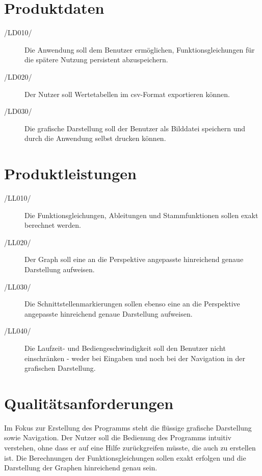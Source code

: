\documentclass[a4paper]{article}
\begin{document}
  \section{Produktdaten}
  
	  \begin{description}
	  	\item[/LD010/] Die Anwendung soll dem Benutzer ermöglichen, Funktionsgleichungen für die spätere Nutzung persistent abzuspeichern.
	  	\item[/LD020/] Der Nutzer soll Wertetabellen im csv-Format exportieren können.
	  	\item[/LD030/] Die grafische Darstellung soll der Benutzer als Bilddatei speichern und durch die Anwendung selbst drucken können.
	  \end{description}

  \section{Produktleistungen}
  
	  \begin{description}
	  	\item[/LL010/] Die Funktionsgleichungen, Ableitungen und Stammfunktionen sollen exakt berechnet werden.
	  	\item[/LL020/] Der Graph soll eine an die Perspektive angepasste hinreichend genaue Darstellung aufweisen.
	  	\item[/LL030/] Die Schnittstellenmarkierungen sollen ebenso eine an die Perspektive angepasste hinreichend genaue Darstellung aufweisen.
	  	\item[/LL040/] Die Laufzeit- und Bediengeschwindigkeit soll den Benutzer nicht einschränken - weder bei Eingaben und noch bei der Navigation in der grafischen Darstellung.
	  \end{description}

  \section{Qualitätsanforderungen}
    Im Fokus zur Erstellung des Programms steht die flüssige grafische Darstellung sowie Navigation. Der Nutzer soll die Bedienung des Programms intuitiv verstehen, ohne dass er auf eine Hilfe zurückgreifen müsste, die auch zu erstellen ist.
    Die Berechnungen der Funktionsgleichungen sollen exakt erfolgen und die Darstellung der Graphen hinreichend genau sein.
\end{document}

